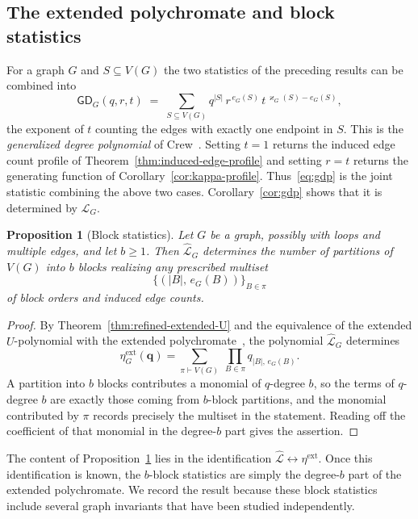 \documentclass[11pt]{article}
\theoremstyle{plain}
\newtheorem{proposition}[theorem]{Proposition}
\theoremstyle{definition}
\renewcommand{\mathcal}{\mathscr}
\newcommand{\LL}{\mathcal{L}}    %
\newcommand{\GD}{\mathsf{GD}}    %
\newcommand{\bq}{\mathbf{q}}
\newcommand{\kp}{\varkappa}
\newcommand{\ext}{\mathrm{ext}}
\numberwithin{equation}{section}
\begin{document}
\subsection{The extended polychromate and block statistics}\label{subsec:block-statistics}

For a graph $G$ and $S\subseteq V(G)$ the two statistics of the preceding
results can be combined into
\begin{equation}\label{eq:gdp}
   \GD_G(q,r,t)
   \;=\;
   \sum_{S\subseteq V(G)}
      q^{|S|}\,r^{\,e_G(S)}\,t^{\,\kp_G(S)-e_G(S)},
\end{equation}
the exponent of $t$ counting the edges with exactly one endpoint in $S$.  This
is the \emph{generalized degree polynomial} of Crew~\cite{Crew}.  Setting $t=1$
returns the induced edge count profile of
Theorem~\ref{thm:induced-edge-profile} and setting $r=t$ returns the generating
function of Corollary~\ref{cor:kappa-profile}. Thus~\eqref{eq:gdp} is the joint
statistic combining the above two cases.
Corollary~\ref{cor:gdp} shows that it is determined by $\widehat{\LL}_G$.

\begin{proposition}[Block statistics]\label{prop:block-statistics}
Let $G$ be a graph, possibly with loops and multiple edges, and let $b\ge 1$.
Then $\widehat{\LL}_G$ determines the number of partitions of $V(G)$ into $b$
blocks realizing any prescribed multiset
\[
   \bigl\{(|B|,\,e_G(B))\bigr\}_{B\in\pi}
\]
of block orders and induced edge counts.
\end{proposition}

\begin{proof}
By Theorem~\ref{thm:refined-extended-U} and the equivalence of the extended
$U$-polynomial with the extended polychromate~\cite[Corollary~4.13]{MN}, the
polynomial $\widehat{\LL}_G$ determines
\[
   \eta^{\ext}_G(\bq)
   =\sum_{\pi\vdash V(G)}\ \prod_{B\in\pi}q_{|B|,\,e_G(B)} .
\]
A partition into $b$ blocks contributes a monomial of $q$-degree $b$, so the
terms of $q$-degree $b$ are exactly those coming from $b$-block partitions, and
the monomial contributed by $\pi$ records precisely the multiset in the
statement.  Reading off the coefficient of that monomial in the degree-$b$ part
gives the assertion.
\end{proof}

The content of Proposition~\ref{prop:block-statistics} lies in the
identification $\widehat{\LL}\leftrightarrow\eta^{\ext}$.  Once this
identification is known, the $b$-block statistics are simply the
degree-$b$ part of the extended polychromate.  We record the result because
these block statistics include several graph invariants that have been
studied independently.
\end{document}
